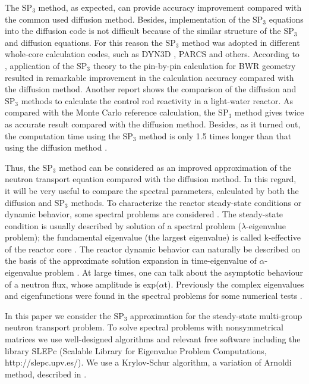 \documentclass{crm-article}
\begin{document}
The $\mathrm{SP_3}$ method, as expected, can provide accuracy improvement compared with the common used diffusion method. 
Besides, implementation of the $\mathrm{SP_3}$ equations into the diffusion code is not difficult because of the similar structure of the $\mathrm{SP_3}$ and diffusion equations. 
For this reason the $\mathrm{SP_3}$ method was adopted in different whole-core calculation codes, such as DYN3D \cite{beckert2008development}, PARCS \cite{downar2010theory} and others. According to \cite{tada2008applicability}, application of the $\mathrm{SP_3}$ theory to the pin-by-pin calculation for BWR geometry resulted in remarkable improvement in the calculation accuracy compared with the diffusion method. 
Another report \cite{Brewster2018} shows the comparison of the diffusion and  $\mathrm{SP_3}$ methods to calculate the control rod reactivity  in a light-water reactor. As compared with the Monte Carlo reference calculation, the  $\mathrm{SP_3}$ method gives twice as accurate result compared with the diffusion method. Besides, as it turned out, the computation time using the $\mathrm{SP_3}$ method is only 1.5 times longer than that using the diffusion method \cite{tada2008applicability}.

Thus, the $\mathrm{SP_3}$ method can be considered as an improved approximation of the neutron transport equation compared with the diffusion method. 
In this regard, it will be very useful to compare the spectral parameters, calculated by both the diffusion and $\mathrm{SP_3}$ methods. 
To characterize the reactor steady-state conditions or dynamic behavior, some spectral problems are considered \cite{stacey2007, bell1970}. 
The steady-state condition is usually described by solution of a spectral problem ($\lambda$-eigenvalue problem); the fundamental eigenvalue (the largest eigenvalue) is called k-effective of the reactor core \cite{stacey2007, bell1970}. 
The reactor dynamic behavior can naturally be described on the basis of the approximate solution expansion in time-eigenvalue of $\alpha$-eigenvalue problem \cite{ginestar2002transient, verdu20103d, verdu2014modal}. 
At large times, one can talk about the asymptotic behaviour of a neutron flux, whose amplitude is exp($\alpha$t). 
Previously the complex eigenvalues and eigenfunctions were found in the spectral problems for some numerical tests \cite{avvakumov2017spectral}.

In this paper we consider the $\mathrm{SP_3}$ approximation for the steady-state multi-group neutron transport problem.
To solve spectral problems with nonsymmetrical matrices we use well-designed algorithms and relevant free software including the library SLEPc (Scalable Library for Eigenvalue Problem Computations, http://slepc.upv.es/). 
We use a Krylov-Schur algorithm, a variation of Arnoldi method, described in \cite{stewart2002krylov}.
\end{document}
